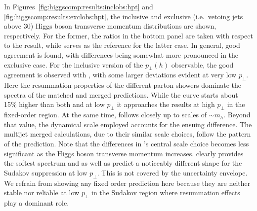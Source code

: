In Figures~\ref{fig:higgscomp:results:inclobs:hpt} and
\ref{fig:higgscomp:results:exclobs:hpt}, the inclusive and exclusive
(i.e.~vetoing jets above $30$\gev) Higgs boson transverse momentum
distributions are shown, respectively.  For the former, the ratios in
the bottom panel are taken with respect to the \HqT result, while
\Powheg \NNLOPS serves as the reference for the latter case. In
general, good agreement is found, with differences being somewhat more
pronounced in the exclusive case. For the inclusive version of the
$p_\perp(h)$ observable, the good agreement is observed with \HqT,
with some larger deviations evident at very low $p_\perp$. Here the 
resummation properties of the different parton showers dominate the 
spectra of the matched and merged predictions. While the
\Sherpa \NNLOPS curve starts about 15\% higher than both \HqT and \Powheg 
\NNLOPS at low $p_\perp$ it approaches the \HqT results at high $p_\perp$ 
in the fixed-order region. At the same time, \Powheg \NNLOPS follows 
\HqT closely up to scales of $\sim m_h$. Beyond that value, the 
dynamical scale employed \Powheg \NNLOPS accounts for the ensuing 
difference. The multijet merged calculations, due to their similar 
scale choices, follow the pattern of the \Powheg \NNLOPS prediction.
Note that the differences in \MGaMC's central scale
choice becomes less significant as the Higgs boson transverse momentum
increases. \Herwig clearly provides the softest spectrum and \Sherpa
as well as \MGaMC predict a noticeably different shape for the Sudakov
suppression at low $p_\perp$. This is not covered by the \HqT
uncertainty envelope. We refrain from showing any fixed order
prediction here because they are neither stable nor reliable at low
$p_\perp$ in the Sudakov region where resummation effects play a 
dominant role.

